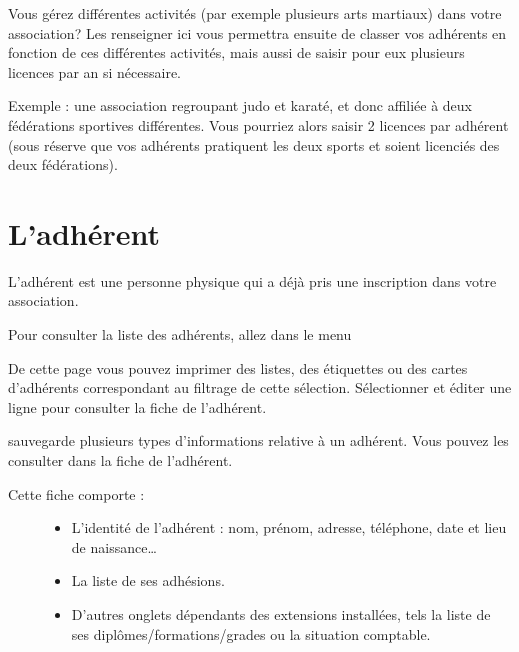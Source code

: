\documentclass[a4paper,10pt,oneside,french]{sphinxmanual}
\begin{document}

Vous gérez différentes activités (par exemple plusieurs arts martiaux) dans votre association? Les renseigner ici vous permettra ensuite de classer vos adhérents en fonction de ces différentes activités, mais aussi de saisir pour eux plusieurs licences par an si nécessaire.

Exemple : une association regroupant judo et karaté, et donc affiliée à deux fédérations sportives différentes.
Vous pourriez alors saisir 2 licences par adhérent (sous réserve que vos adhérents pratiquent les deux sports et soient licenciés des deux fédérations).
\begin{quote}

\noindent{}
\end{quote}


\section{L’adhérent}
\label{\detokenize{member/member::doc}}\label{\detokenize{member/member:ladherent}}
L’adhérent est une personne physique qui a déjà pris une inscription dans votre association.

Pour consulter la liste des adhérents, allez dans le menu 

\noindent{}

De cette page vous pouvez imprimer des listes, des étiquettes ou des cartes d’adhérents correspondant au filtrage de cette sélection.
Sélectionner et éditer une ligne pour consulter la fiche de l’adhérent.

 sauvegarde plusieurs types d’informations relative à un adhérent. Vous pouvez les consulter dans la fiche de l’adhérent.

\noindent{}
\begin{description}
\item[{Cette fiche comporte :}] \leavevmode\begin{itemize}
\item {} 
L’identité de l’adhérent : nom, prénom, adresse, téléphone, date et lieu de naissance…

\item {} 
La liste de ses adhésions.

\item {} 
D’autres onglets dépendants des extensions installées, tels la liste de ses diplômes/formations/grades ou la situation comptable.

\end{itemize}

\end{description}
\end{document}
